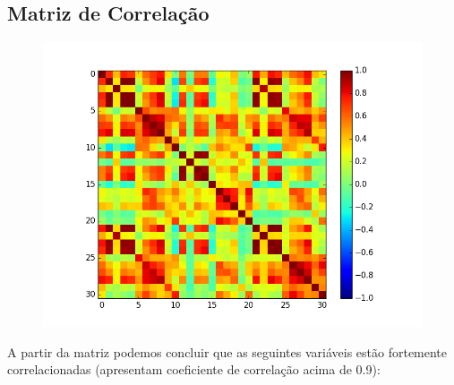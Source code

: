 \documentclass[11pt,a4paper]{article}
\numberwithin{equation}{section}
\begin{document}
\subsection{Matriz de Correlação}
\begin{figure}[H]
\centering
  \includegraphics[width=\linewidth]{./img/corrcoef_range.png}
  \label{fig:test1}
\end{figure}%

A partir da matriz podemos concluir que as seguintes variáveis estão fortemente correlacionadas (apresentam coeficiente de correlação acima de 0.9):
\end{document}
